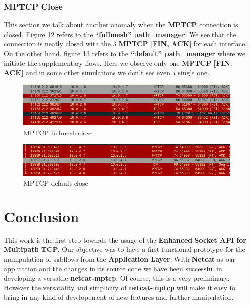 \documentclass[a4paper,11pt]{article}
\begin{document}
			\subsubsection{MPTCP Close}
			\label{subsubsec:mptcpclose}
			This section we talk about another anomaly when the \textbf{MPTCP} connection is closed. Figure \hyperref[fig:fullmeshfin]{12} refers to the \textbf{``fullmesh'' path\_manager}. We see that the connection is neatly closed with the 3 \textbf{MPTCP [FIN, ACK]} for each interface. On the other hand, figure \hyperref[fig:defaultfin]{13} refers to the \textbf{``default'' path\_manager} where we initiate the supplementary flows. Here we observe only one \textbf{MPTCP [FIN, ACK]} and in some other simulations we don't see even a single one.
			\begin{figure}[h!]
				\centering
					\label{fig:fullmeshfin}
					\includegraphics[scale=0.5]{pictures/fullmeshfin.jpg}
					\caption[]{MPTCP fullmesh close}
			\end{figure}
			\begin{figure}[h!]
				\centering
					\label{fig:defaultfin}
					\includegraphics[scale=0.5]{pictures/defaultfin.jpg}
					\caption[]{MPTCP default close}
			\end{figure}


	
	\section{Conclusion}
		\label{sec:conclusion}
	 	This work is the first step towards the usage of the \textbf{Enhanced Socket API for Multipath TCP}. Our objective was to have a first functional prototype for the manipulation of subflows from the \textbf{Application Layer}. With \textbf{Netcat} as our application and the changes in its source code we have been successful in developing a versatile \textbf{netcat-mptcp}. Of course, this is a very preliminary. However the versatality and simplicity of \textbf{netcat-mptcp} will make it easy to bring in any kind of developement of new features and further manipulation.
		 	
\end{document}
